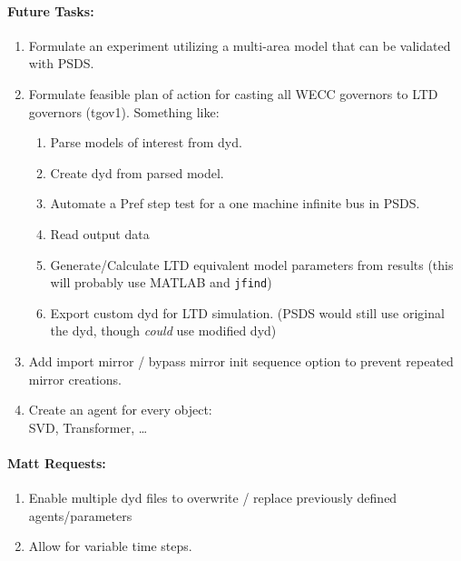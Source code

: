 \documentclass[12pt]{article}
\begin{document}
\begin{multicols}{2}
\begin{enumerate}
		


\vfill\null
\columnbreak

\paragraph{Future Tasks:} %
	\begin{enumerate}
		\item Formulate an experiment utilizing a multi-area model that can be validated with PSDS.
		

		\item Formulate feasible plan of action for casting all WECC governors to LTD governors (tgov1). Something like:
		\begin{enumerate}
		\item Parse models of interest from dyd.
		\item Create dyd from parsed model.
		\item Automate a Pref step test for a one machine infinite bus in PSDS.
		\item Read output data
		\item Generate/Calculate LTD equivalent model parameters from results (this will probably use MATLAB and \verb|jfind|)
		\item Export custom dyd for LTD simulation. (PSDS would still use original the dyd, though \emph{could} use modified dyd)
		\end{enumerate}

		\item Add import mirror / bypass mirror init sequence option to prevent repeated mirror creations.

		\item Create an agent for every object: \\ SVD, Transformer, \ldots
		
	\end{enumerate}

\paragraph{Matt Requests:}
\begin{enumerate}
		\item Enable multiple dyd files to overwrite / replace previously defined agents/parameters
		\item Allow for variable time steps.
\end{enumerate}


\end{enumerate}
\end{multicols}
\end{document}

